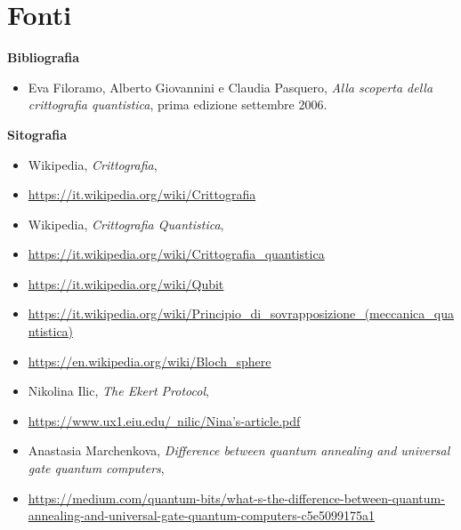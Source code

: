 \documentclass[a4paper, 12pt]{article}
\begin{document}
\section{Fonti}
{\large \textbf{Bibliografia}\par}
\begin{itemize}
    \item Eva Filoramo, Alberto Giovannini e Claudia Pasquero, \textit{Alla scoperta della crittografia quantistica}, prima edizione settembre 2006.
\end{itemize}
{\large \textbf{Sitografia}\par}
\begin{itemize}
    \item Wikipedia, \textit{Crittografia}, 
    \item[] \href{https://it.wikipedia.org/wiki/Crittografia}{https://it.wikipedia.org/wiki/Crittografia}
    \item Wikipedia, \textit{Crittografia Quantistica},
    \item[] \href{https://it.wikipedia.org/wiki/Crittografia\_quantistica}{https://it.wikipedia.org/wiki/Crittografia\_quantistica}
    \item[] \href{https://it.wikipedia.org/wiki/Qubit}{https://it.wikipedia.org/wiki/Qubit}
    \item[] \href{https://it.wikipedia.org/wiki/Principio\_di\_sovrapposizione\_(meccanica\_quantistica)}{https://it.wikipedia.org/wiki/Principio\_di\_sovrapposizione\_(meccanica\_quantistica)}
    \item[] \href{https://en.wikipedia.org/wiki/Bloch\_sphere}{https://en.wikipedia.org/wiki/Bloch\_sphere}
    \item Nikolina  Ilic, \textit{The Ekert Protocol},
    \item[] \href{https://www.ux1.eiu.edu/~nilic/Nina's-article.pdf}{https://www.ux1.eiu.edu/~nilic/Nina's-article.pdf}
    \item Anastasia Marchenkova, \textit{Difference between quantum annealing and universal gate quantum computers},
    \item[] \href{https://medium.com/quantum-bits/what-s-the-difference-between-quantum-annealing-and-universal-gate-quantum-computers-c5e5099175a1}{https://medium.com/quantum-bits/what-s-the-difference-between-quantum-annealing-and-universal-gate-quantum-computers-c5e5099175a1}
\end{itemize}
\end{document}
